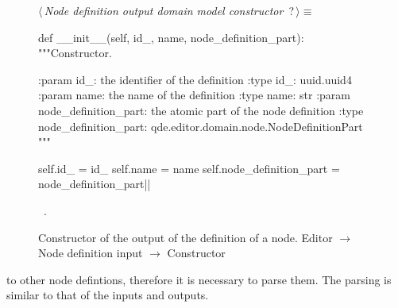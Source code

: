 \documentclass[%
    a4paper,    %
    justified,  %
    nobib,      %
    openany     %
]{tufte-book}
\begin{document}
\begin{figure}
\begin{flushleft} \small
\begin{minipage}{\linewidth}\label{scrap139}\raggedright\small
{} $\langle\,${\itshape Node definition output domain model constructor}\nobreak\ {\footnotesize {?}}$\,\rangle\equiv$
\vspace{-1ex}
\begin{pythoncode}
def __init__(self, id_, name, node_definition_part):
    """Constructor.

    :param id_: the identifier of the definition
    :type  id_: uuid.uuid4
    :param name: the name of the definition
    :type  name: str
    :param node_definition_part: the atomic part of the node definition
    :type node_definition_part: qde.editor.domain.node.NodeDefinitionPart
    """

    self.id_                  = id_
    self.name                 = name
    self.node_definition_part = node_definition_part|\NWsep|
\end{pythoncode}
\vspace{1.5ex}
\footnotesize
\begin{list}{}{\setlength{\itemsep}{-\parsep}\setlength{\itemindent}{-\leftmargin}}
\item \NWtxtMacroRefIn\ .

\item{}
\end{list}
\end{minipage}\vspace{4ex}
\end{flushleft}
\caption{Constructor of the output of the definition of a node.
  \newline{}\newline{}Editor $\rightarrow$ Node definition input $\rightarrow$
  Constructor}
\label{editor:lst:node-definition-input:constructor}
\end{figure}

 to other node defintions,
therefore it is necessary to parse them. The parsing is similar to that of the
inputs and outputs.
\end{document}
